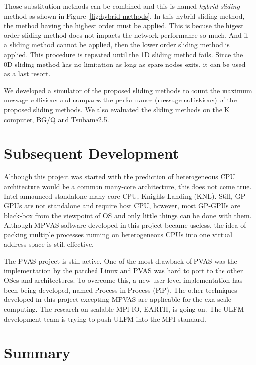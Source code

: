 Those substitution methods can be combined and this is named {\em
hybrid sliding} method as shown in Figure~\ref{fig:hybrid-methods}. In
this hybrid sliding method, the method having the highest order must
be applied. This is becuse the higest order sliding method does not
impacts the network performance so much. 
And if a sliding method cannot be applied, then the
lower order sliding method is applied. This procedure is repeated
until the 1D sliding method fails.
Since the 0D sliding method has no
limitation as long as spare nodes exits, it can be used as a last resort.

We developed a simulator of the proposed sliding methods to count the 
maximum message collisions and compares the performance (message
colliskions) of the proposed sliding methods. We also evaluated the
sliding methods on the K computer, BG/Q and
Tsubame2.5\cite{Hori:2015:SSF:2802658.2802670}.  

\section{Subsequent Development}

Although this project was started with the prediction of
heterogeneous CPU architecture would be a common many-core
architecture, this does not come true. Intel announced standalone
many-core CPU, Knights Landing (KNL). Still, GP-GPUs are not
standalone and require host CPU, however, most GP-GPUs are black-box
from the viewpoint of OS and only little things can be done with
them. Although MPVAS software developed in this project became
useless, the idea of packing multiple processes running on
heterogeneous CPUs into one virtual
address space is still effective.

The PVAS project is still active. One of the most drawback of PVAS was
the implementation by the patched Linux and PVAS was hard to port to the
other OSes and architectures. To overcome this, a new
user-level implementation has been being developed, named
Process-in-Process (PiP). 
The other techniques developed in this project excepting MPVAS are
applicable for the exa-scale computing. The research on scalable
MPI-IO, EARTH, is going on. The ULFM development team is
trying to push ULFM into the MPI standard.

\section{Summary}
